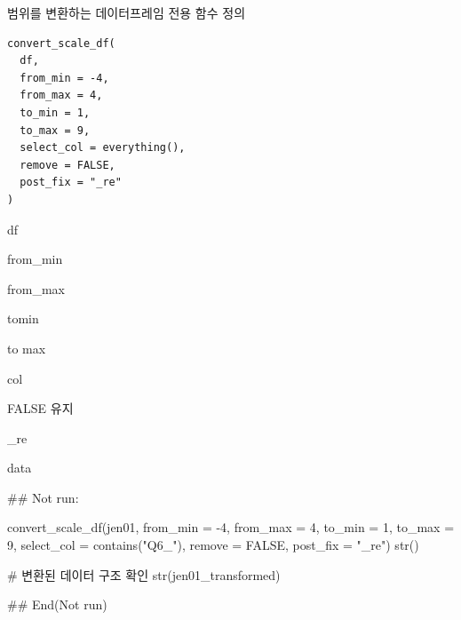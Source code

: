 \documentclass[a4paper]{book}
\begin{document}
%
\begin{Description}
범위를 변환하는 데이터프레임 전용 함수 정의
\end{Description}
%
\begin{Usage}
\begin{verbatim}
convert_scale_df(
  df,
  from_min = -4,
  from_max = 4,
  to_min = 1,
  to_max = 9,
  select_col = everything(),
  remove = FALSE,
  post_fix = "_re"
)
\end{verbatim}
\end{Usage}
%
\begin{Arguments}
\begin{ldescription}
\item[\code{df}] df

\item[\code{from\_min}] from\_min

\item[\code{from\_max}] from\_max

\item[\code{to\_min}] tomin

\item[\code{to\_max}] to max

\item[\code{select\_col}] col

\item[\code{remove}] FALSE 유지

\item[\code{post\_fix}] \_re
\end{ldescription}
\end{Arguments}
%
\begin{Value}
data
\end{Value}
%
\begin{Examples}
\begin{ExampleCode}
\#\# Not run: 

convert_scale_df(jen01, from_min = -4, from_max = 4, to_min = 1, to_max = 9,
                 select_col = contains("Q6_"), remove = FALSE, post_fix = "_re") %
                 str()

# 변환된 데이터 구조 확인
str(jen01_transformed)

## End(Not run)
\end{ExampleCode}
\end{Examples}
\end{document}
